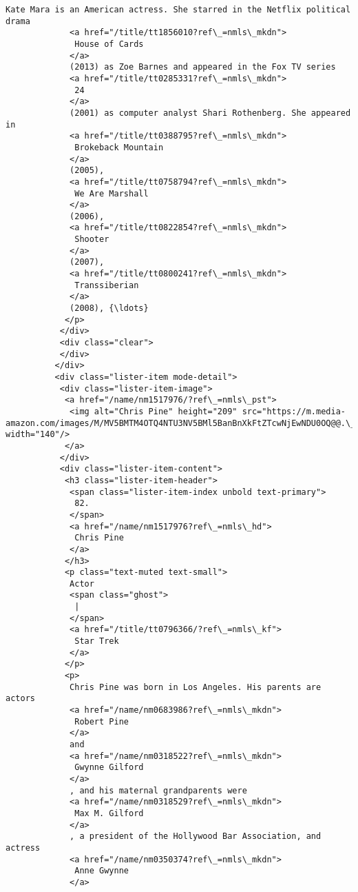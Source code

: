 \documentclass[11pt]{article}
\begin{document}
\begin{Verbatim}[commandchars=\\\{\}]
             Kate Mara is an American actress. She starred in the Netflix political drama
             <a href="/title/tt1856010?ref\_=nmls\_mkdn">
              House of Cards
             </a>
             (2013) as Zoe Barnes and appeared in the Fox TV series
             <a href="/title/tt0285331?ref\_=nmls\_mkdn">
              24
             </a>
             (2001) as computer analyst Shari Rothenberg. She appeared in
             <a href="/title/tt0388795?ref\_=nmls\_mkdn">
              Brokeback Mountain
             </a>
             (2005),
             <a href="/title/tt0758794?ref\_=nmls\_mkdn">
              We Are Marshall
             </a>
             (2006),
             <a href="/title/tt0822854?ref\_=nmls\_mkdn">
              Shooter
             </a>
             (2007),
             <a href="/title/tt0800241?ref\_=nmls\_mkdn">
              Transsiberian
             </a>
             (2008), {\ldots}
            </p>
           </div>
           <div class="clear">
           </div>
          </div>
          <div class="lister-item mode-detail">
           <div class="lister-item-image">
            <a href="/name/nm1517976/?ref\_=nmls\_pst">
             <img alt="Chris Pine" height="209" src="https://m.media-amazon.com/images/M/MV5BMTM4OTQ4NTU3NV5BMl5BanBnXkFtZTcwNjEwNDU0OQ@@.\_V1\_UX140\_CR0,0,140,209\_AL\_.jpg" width="140"/>
            </a>
           </div>
           <div class="lister-item-content">
            <h3 class="lister-item-header">
             <span class="lister-item-index unbold text-primary">
              82.
             </span>
             <a href="/name/nm1517976?ref\_=nmls\_hd">
              Chris Pine
             </a>
            </h3>
            <p class="text-muted text-small">
             Actor
             <span class="ghost">
              |
             </span>
             <a href="/title/tt0796366/?ref\_=nmls\_kf">
              Star Trek
             </a>
            </p>
            <p>
             Chris Pine was born in Los Angeles. His parents are actors
             <a href="/name/nm0683986?ref\_=nmls\_mkdn">
              Robert Pine
             </a>
             and
             <a href="/name/nm0318522?ref\_=nmls\_mkdn">
              Gwynne Gilford
             </a>
             , and his maternal grandparents were
             <a href="/name/nm0318529?ref\_=nmls\_mkdn">
              Max M. Gilford
             </a>
             , a president of the Hollywood Bar Association, and actress
             <a href="/name/nm0350374?ref\_=nmls\_mkdn">
              Anne Gwynne
             </a>

\end{Verbatim}
\end{document}

